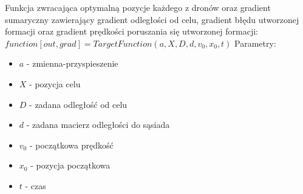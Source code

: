 \documentclass[a4paper, 11pt, oneside]{article}
\begin{document}
Funkcja zwracająca optymalną pozycje każdego z dronów oraz gradient sumaryczny zawierający gradient odległości od celu, gradient błędu utworzonej formacji oraz gradient prędkości poruszania się utworzonej formacji:
\newline 
$function [out,grad]=TargetFunction(a,X,D,d,v_{0},x_{0},t)$
\newline
Parametry:
\begin{itemize}
\item $a$ - zmienna-przyspieszenie
\item $X$ - pozycja celu
\item $D$ - zadana odległość od celu 
\item $d$ - zadana macierz odległości do sąsiada
\item $v_{0}$ - początkowa prędkość
\item $x_{0}$ - pozycja początkowa
\item $t$ -  czas
\end{itemize}
\end{document}
